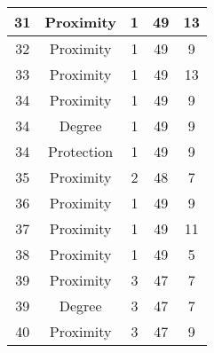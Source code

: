 \documentclass[results.tex]{subfiles}
\begin{document}
\begin{center}
\begin{tabular}{| c || c | c | c | c |}
            \hline
            31                      & Proximity                    & 1                      & 49                      & 13                   \\
            \hline
            32                      & Proximity                    & 1                      & 49                      & 9                    \\
            \hline
            33                      & Proximity                    & 1                      & 49                      & 13                   \\
            \hline
            34                      & Proximity                    & 1                      & 49                      & 9                    \\
            \hline
            34                      & Degree                       & 1                      & 49                      & 9                    \\
            \hline
            34                      & Protection                   & 1                      & 49                      & 9                    \\
            \hline
            35                      & Proximity                    & 2                      & 48                      & 7                    \\
            \hline
            36                      & Proximity                    & 1                      & 49                      & 9                    \\
            \hline
            37                      & Proximity                    & 1                      & 49                      & 11                   \\
            \hline
            38                      & Proximity                    & 1                      & 49                      & 5                    \\
            \hline
            39                      & Proximity                    & 3                      & 47                      & 7                    \\
            \hline
            39                      & Degree                       & 3                      & 47                      & 7                    \\
            \hline
            40                      & Proximity                    & 3                      & 47                      & 9                    \\

\end{tabular}
\end{center}
\end{document}
